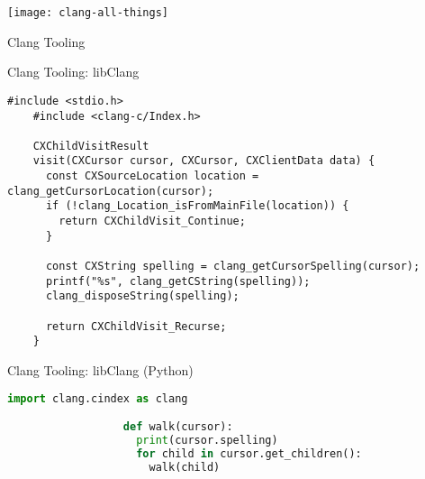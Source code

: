 
\begin{slide}{}
  \texttt{[image: clang-all-things]}
\end{slide}

\begin{slide}{Clang Tooling}\end{slide}

\begin{frame}[fragile]{Clang Tooling: libClang}
  \begin{lstlisting}[basicstyle=\ttfamily\scriptsize]
    #include <stdio.h>
    #include <clang-c/Index.h>

    CXChildVisitResult
    visit(CXCursor cursor, CXCursor, CXClientData data) {
      const CXSourceLocation location = clang_getCursorLocation(cursor);
      if (!clang_Location_isFromMainFile(location)) {
        return CXChildVisit_Continue;
      }

      const CXString spelling = clang_getCursorSpelling(cursor);
      printf("%s", clang_getCString(spelling));
      clang_disposeString(spelling);

      return CXChildVisit_Recurse;
    }
  \end{lstlisting}
\end{frame}

\begin{frame}[fragile]{Clang Tooling: libClang (Python)}
  \pause
  \begin{lstlisting}[basicstyle=\ttfamily\scriptsize, language=python]
                  import clang.cindex as clang

                  def walk(cursor):
                    print(cursor.spelling)
                    for child in cursor.get_children():
                      walk(child)
  \end{lstlisting}
\end{frame}


